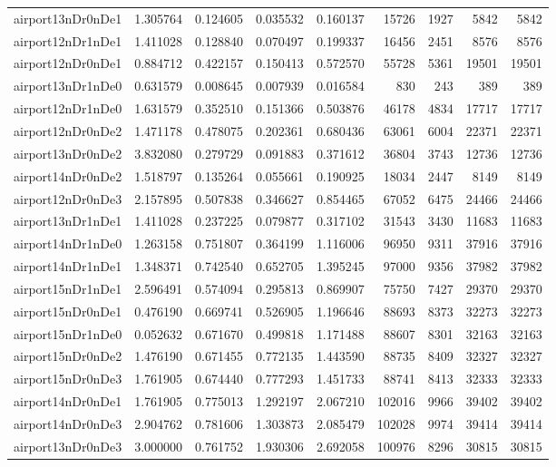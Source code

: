\begin{longtable}{|l|r|r|r|r|r|r|r|r|}
airport13nDr0nDe1 & 1.305764 & 0.124605 & 0.035532 & 0.160137 & 15726 & 1927 & 5842 & 5842 \\
airport12nDr1nDe1 & 1.411028 & 0.128840 & 0.070497 & 0.199337 & 16456 & 2451 & 8576 & 8576 \\
airport12nDr0nDe1 & 0.884712 & 0.422157 & 0.150413 & 0.572570 & 55728 & 5361 & 19501 & 19501 \\
airport13nDr1nDe0 & 0.631579 & 0.008645 & 0.007939 & 0.016584 & 830 & 243 & 389 & 389 \\
airport12nDr1nDe0 & 1.631579 & 0.352510 & 0.151366 & 0.503876 & 46178 & 4834 & 17717 & 17717 \\
airport12nDr0nDe2 & 1.471178 & 0.478075 & 0.202361 & 0.680436 & 63061 & 6004 & 22371 & 22371 \\
airport13nDr0nDe2 & 3.832080 & 0.279729 & 0.091883 & 0.371612 & 36804 & 3743 & 12736 & 12736 \\
airport14nDr0nDe2 & 1.518797 & 0.135264 & 0.055661 & 0.190925 & 18034 & 2447 & 8149 & 8149 \\
airport12nDr0nDe3 & 2.157895 & 0.507838 & 0.346627 & 0.854465 & 67052 & 6475 & 24466 & 24466 \\
airport13nDr1nDe1 & 1.411028 & 0.237225 & 0.079877 & 0.317102 & 31543 & 3430 & 11683 & 11683 \\
airport14nDr1nDe0 & 1.263158 & 0.751807 & 0.364199 & 1.116006 & 96950 & 9311 & 37916 & 37916 \\
airport14nDr1nDe1 & 1.348371 & 0.742540 & 0.652705 & 1.395245 & 97000 & 9356 & 37982 & 37982 \\
airport15nDr1nDe1 & 2.596491 & 0.574094 & 0.295813 & 0.869907 & 75750 & 7427 & 29370 & 29370 \\
airport15nDr0nDe1 & 0.476190 & 0.669741 & 0.526905 & 1.196646 & 88693 & 8373 & 32273 & 32273 \\
airport15nDr1nDe0 & 0.052632 & 0.671670 & 0.499818 & 1.171488 & 88607 & 8301 & 32163 & 32163 \\
airport15nDr0nDe2 & 1.476190 & 0.671455 & 0.772135 & 1.443590 & 88735 & 8409 & 32327 & 32327 \\
airport15nDr0nDe3 & 1.761905 & 0.674440 & 0.777293 & 1.451733 & 88741 & 8413 & 32333 & 32333 \\
airport14nDr0nDe1 & 1.761905 & 0.775013 & 1.292197 & 2.067210 & 102016 & 9966 & 39402 & 39402 \\
airport14nDr0nDe3 & 2.904762 & 0.781606 & 1.303873 & 2.085479 & 102028 & 9974 & 39414 & 39414 \\
airport13nDr0nDe3 & 3.000000 & 0.761752 & 1.930306 & 2.692058 & 100976 & 8296 & 30815 & 30815 \\

\end{longtable}

